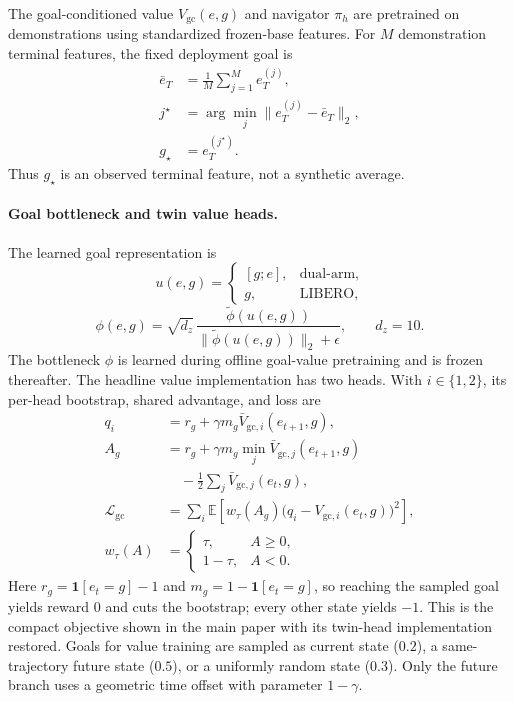 \documentclass[letterpaper]{article} %
\begin{document}
The goal-conditioned value $V_{\mathrm{gc}}(e,g)$ and navigator $\pi_h$ are
pretrained on demonstrations using standardized frozen-base features. For $M$
demonstration terminal features, the fixed deployment goal is
\[
\begin{aligned}
\bar e_T&=\frac{1}{M}\sum_{j=1}^{M}e_T^{(j)},\\
j^\star&=\arg\min_j\lVert e_T^{(j)}-\bar e_T\rVert_2,\\
g_\star&=e_T^{(j^\star)}.
\end{aligned}
\]
Thus $g_\star$ is an observed terminal feature, not a synthetic average.

\paragraph{Goal bottleneck and twin value heads.}
The learned goal representation is
\[
u(e,g)=
\begin{cases}
[g;e],&\text{dual-arm},\\
g,&\text{LIBERO},
\end{cases}
\]
\[
\phi(e,g)=\sqrt{d_z}\,
\frac{\widetilde\phi(u(e,g))}
{\lVert\widetilde\phi(u(e,g))\rVert_2+\epsilon},
\qquad d_z=10.
\]
The bottleneck $\phi$ is learned during offline goal-value pretraining and is
frozen thereafter. The headline value implementation has two heads. With
$i\in\{1,2\}$, its per-head bootstrap, shared advantage, and loss are
\[
\begin{aligned}
q_i
&=r_g+\gamma m_g\bar V_{\mathrm{gc},i}(e_{t+1},g),\\
A_g
&=r_g+\gamma m_g\min_j\bar V_{\mathrm{gc},j}(e_{t+1},g)\\
&\quad-\frac12\sum_j\bar V_{\mathrm{gc},j}(e_t,g),\\
\mathcal L_{\mathrm{gc}}
&=\sum_i\mathbb E\!\left[
 w_\tau(A_g)
 \big(q_i-V_{\mathrm{gc},i}(e_t,g)\big)^2
\right],\\
w_\tau(A)
&=
\begin{cases}
\tau,&A\ge0,\\
1-\tau,&A<0.
\end{cases}
\end{aligned}
\]
Here $r_g=\mathbf 1[e_t=g]-1$ and
$m_g=1-\mathbf 1[e_t=g]$, so reaching the sampled goal yields reward $0$ and
cuts the bootstrap; every other state yields $-1$. This is the compact
objective shown in the main paper with its twin-head implementation restored.
Goals for value training are sampled as current state ($0.2$), a
same-trajectory future state ($0.5$), or a uniformly random state ($0.3$).
Only the future branch uses a geometric time offset with parameter
$1-\gamma$.
\end{document}
